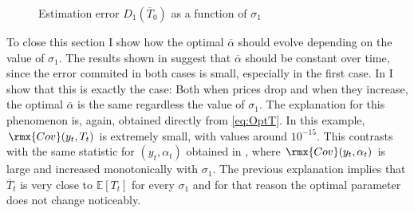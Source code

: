 \documentclass[english, a4paper, 12pt]{article}
\begin{document}
\newpage
\vfill
	\begin{figure}[H] 
		\caption{Estimation error $D_{1}(\overline{T}_{0})$ as a function of $\sigma_{1}$}
		\label{fig:CategoryDiff0Plot}
		\hspace{0.02\textwidth}
		
		\vspace{-1.5ex}
	\end{figure}

\vfill

To close this section I show how the optimal $\overline{\alpha}$ should evolve depending on the value of $\sigma_{1}$. The results shown in  suggest that $\overline{\alpha}$ should be constant over time, since the error commited in both cases is small, especially in the first case. In  I show that this is exactly the case: Both when prices drop and when they increase, the optimal $\overline{\alpha}$ is the same regardless the value of $\sigma_{1}$. The explanation for this phenomenon is, again, obtained directly from \eqref{eq:OptT}. In this example, $\rmx{Cov}(y_{t}, T_{t})$ is extremely small, with values around $10^{-15}$. This contrasts with the same statistic for $(y_{t}, \alpha_{t})$ obtained in , where $\rmx{Cov}(y_{t}, \alpha_{t})$ is large and increased monotonically with $\sigma_{1}$. The previous explanation implies that $\overline{T}_{t}$ is very close to $\mathbb{E}[T_{t}]$ for every $\sigma_{1}$ and for that reason the optimal parameter does not change noticeably.
\end{document}
